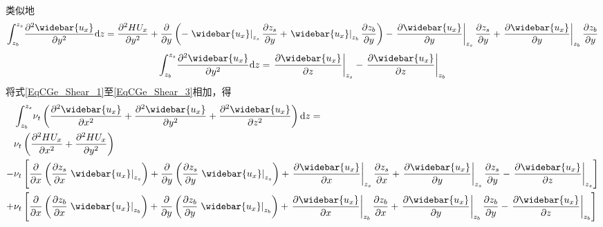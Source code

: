 类似地
\begin{equation}
    \int_{z_{b}}^{ z_{s}}\!
    \frac{\partial^{2} \widebar{u_{x}}}{\partial y^{2}}
    \mathrm{d}z
    =
    \frac{\partial^{2} HU_{x}}{\partial y^{2}} +
    \frac{\partial}{\partial y}
    \left(
    -
    \left.\widebar{u_{x}}\right|_{z_{s}}\frac{\partial  z_{s}}{\partial y}
    +
    \left.\widebar{u_{x}}\right|_{z_{b}}\frac{\partial z_{b}}{\partial y}
    \right)
    -
    \left.\frac{\partial \widebar{u_{x}}}{\partial y}\right|_{z_{s}}\frac{\partial  z_{s}}{\partial y}
    +
    \left.\frac{\partial \widebar{u_{x}}}{\partial y}\right|_{z_{b}}\frac{\partial z_{b}}{\partial y}
  \label{EqCGe_Shear_2}
\end{equation}
\begin{equation}
    \int_{z_{b}}^{ z_{s}}\!
    \frac{\partial^{2} \widebar{u_{x}}}{\partial y^{2}}
    \mathrm{d}z
    =
    \left.\frac{\partial \widebar{u_{x}}}{\partial z}\right|_{z_{s}}
      -
      \left.\frac{\partial \widebar{u_{x}}}{\partial z}\right|_{z_{b}}
  \label{EqCGe_Shear_3}
\end{equation}
将式\eqref{EqCGe_Shear_1}至\eqref{EqCGe_Shear_3}相加，得
\begin{equation}
  \begin{aligned}
    &\int_{z_{b}}^{ z_{s}}\!
    \nu_{t}
    \left(
      \frac{\partial^{2} \widebar{u_{x}}}{\partial x^{2}} +
      \frac{\partial^{2} \widebar{u_{x}}}{\partial y^{2}} +
      \frac{\partial^{2} \widebar{u_{x}}}{\partial z^{2}}
    \right)
    \mathrm{d}z =\\
     &
    \nu_{t}
    \left(
    \frac{\partial^{2} HU_{x}}{\partial x^{2}} +
    \frac{\partial^{2} HU_{x}}{\partial y^{2}}
  \right)
  \\
      -&\nu_{t}
      \left[
    \frac{\partial}{\partial x}
    \left(
    \frac{\partial  z_{s}}{\partial x}
\left.\widebar{u_{x}}\right|_{z_{s}}
\right)
+
    \frac{\partial}{\partial y}
    \left(
    \frac{\partial  z_{s}}{\partial y}
\left.\widebar{u_{x}}\right|_{z_{s}}
\right)
+
\left.\frac{\partial \widebar{u_{x}}}{\partial x}\right|_{z_{s}}
    \frac{\partial  z_{s}}{\partial x}
  +
\left.\frac{\partial \widebar{u_{x}}}{\partial y}\right|_{z_{s}}
    \frac{\partial  z_{s}}{\partial y}
    -
    \left.\frac{\partial \widebar{u_{x}}}{\partial z}\right|_{z_{s}}
        \right]
        \\
      +&\nu_{t}
      \left[
    \frac{\partial}{\partial x}
    \left(
    \frac{\partial z_{b}}{\partial x}
\left.\widebar{u_{x}}\right|_{z_{b}}
\right)
+
    \frac{\partial}{\partial y}
    \left(
    \frac{\partial z_{b}}{\partial y}
\left.\widebar{u_{x}}\right|_{z_{b}}
\right)
+
\left.\frac{\partial \widebar{u_{x}}}{\partial x}\right|_{z_{b}}
    \frac{\partial z_{b}}{\partial x}
  +
\left.\frac{\partial \widebar{u_{x}}}{\partial y}\right|_{z_{b}}
    \frac{\partial z_{b}}{\partial y}
-
    \left.\frac{\partial \widebar{u_{x}}}{\partial z}\right|_{z_{b}}
        \right]
  \end{aligned}
  \label{EqCGe_Shear_Total}
\end{equation}
